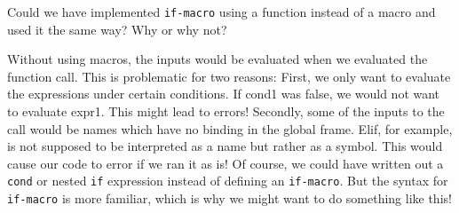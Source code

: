 \begin{blocksection}
\question Could we have implemented \texttt{if-macro} using a function instead of a macro and used it the same way? Why or why not?
\begin{solution}
Without using macros, the inputs would be evaluated when we evaluated the function call. This is problematic for two reasons:
\newline
First, we only want to evaluate the expressions under certain conditions. If cond1 was false, we would not want to evaluate expr1. This might lead to errors!
\newline
Secondly, some of the inputs to the call would be names which have no binding in the global frame. Elif, for example, is not supposed to be interpreted as a name
but rather as a symbol. This would cause our code to error if we ran it as is!
\newline
Of course, we could have written out a \texttt{cond} or nested \texttt{if} expression instead of defining an \texttt{if-macro}. But the syntax for \texttt{if-macro} 
is more familiar, which is why we might want to do something like this!
\end{solution}
\end{blocksection}